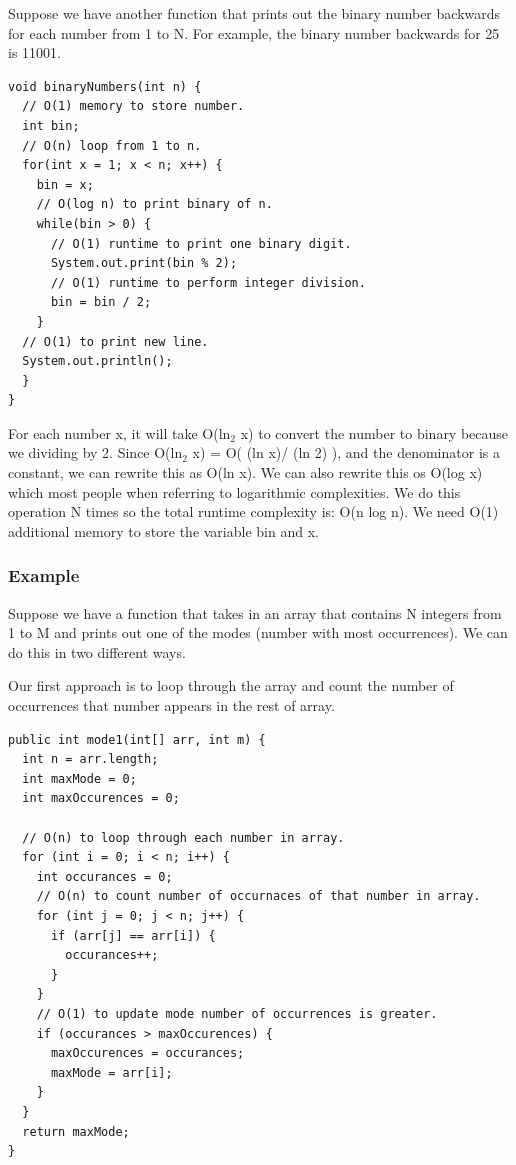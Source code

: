 \documentclass[11pt,oneside]{book}
\begin{document}
Suppose we have another function that prints out the binary number backwards for each number from 1 to N. For example, the binary number backwards for 25 is 11001.

\begin{lstlisting}
void binaryNumbers(int n) {
  // O(1) memory to store number.
  int bin;
  // O(n) loop from 1 to n.
  for(int x = 1; x < n; x++) {
    bin = x;
    // O(log n) to print binary of n.
    while(bin > 0) {
      // O(1) runtime to print one binary digit.
      System.out.print(bin % 2);
      // O(1) runtime to perform integer division.
      bin = bin / 2; 
    }
  // O(1) to print new line.
  System.out.println();
  }
}
\end{lstlisting}

For each number x, it will take O(ln$_{2}$ x) to convert the number to binary because we dividing by 2. Since O(ln$_{2}$ x) = O( (ln x)/ (ln 2) ), and the denominator is a constant, we can rewrite this as O(ln x). We can also rewrite this os O(log x) which most people when referring to logarithmic complexities. We do this operation N times so the total runtime complexity is: O(n log n). We need O(1) additional memory to store the variable bin and x.

\subsubsection{Example}

Suppose we have a function that takes in an array that contains N integers from 1 to M and prints out one of the modes (number with most occurrences). We can do this in two different ways.

Our first approach is to loop through the array and count the number of occurrences that number appears in the rest of array.

\begin{lstlisting}
public int mode1(int[] arr, int m) {
  int n = arr.length;
  int maxMode = 0;
  int maxOccurences = 0;
  
  // O(n) to loop through each number in array.
  for (int i = 0; i < n; i++) {
    int occurances = 0;
    // O(n) to count number of occurnaces of that number in array.
    for (int j = 0; j < n; j++) {
      if (arr[j] == arr[i]) {
        occurances++;
      }
    }
    // O(1) to update mode number of occurrences is greater. 
    if (occurances > maxOccurences) {
      maxOccurences = occurances;
      maxMode = arr[i];
    }
  }
  return maxMode;
}
\end{lstlisting}
\end{document}
